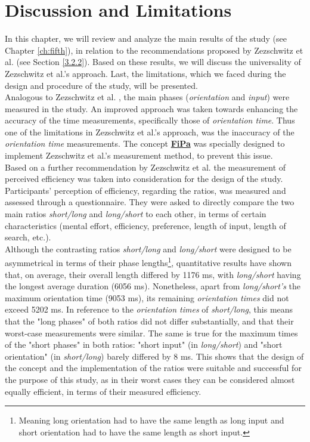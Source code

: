 
\chapter{Discussion and Limitations}\label{ch:sixth}

In this chapter, we will review and analyze the main results of the study (see Chapter \ref{ch:fifth}), in relation to the recommendations proposed by Zezschwitz et al. \cite{Zezschwitz} (see Section \ref{3.2.2}). Based on these results, we will discuss the universality of Zezschwitz et al.'s \cite{Zezschwitz} approach. Last, the limitations, which we faced during the design and procedure of the study, will be presented.\\

Analogous to Zezschwitz et al. \cite{Zezschwitz}, the main phases (\textit{orientation} and \textit{input}) were measured in the study. An improved approach was taken towards enhancing the accuracy of the time measurements, specifically those of \textit{orientation time}. Thus one of the limitations in Zezschwitz et al.'s \cite{Zezschwitz} approach, was the inaccuracy of the \textit{orientation time} measurements. The concept \underline{\textbf{FiPa}} was specially designed to implement Zezschwitz et al.'s \cite{Zezschwitz} measurement method, to prevent this issue. \\
Based on a further recommendation by Zezschwitz et al. \cite{Zezschwitz} the measurement of perceived efficiency was taken into consideration for the design of the study. Participants' perception of efficiency, regarding the ratios, was measured and assessed through a questionnaire. They were asked to directly compare the two main ratios \textit{short/long} and \textit{long/short} to each other, in terms of certain characteristics (mental effort, efficiency, preference, length of input, length of search, etc.). \\

Although the contrasting ratios \textit{short/long} and \textit{long/short} were designed to be asymmetrical in terms of their phase lengths\footnote{Meaning long orientation had to have the same length as long input and short orientation had to have the same length as short input.}, quantitative results have shown that, on average, their overall length differed by 1176 ms, with \textit{long/short} having the longest average duration (6056 ms). Nonetheless, apart from \textit{long/short's} the maximum orientation time (9053 ms), its remaining \textit{orientation times} did not exceed 5202 ms. In reference to the \textit{orientation times} of \textit{short/long}, this means that the "long phases" of both ratios did not differ substantially, and that their worst-case measurements were similar. The same is true for the maximum times of the "short phases" in both ratios: "short input" (in \textit{long/short}) and "short orientation" (in \textit{short/long}) barely differed by 8 ms. This shows that the design of the concept and the implementation of the ratios were suitable and successful for the purpose of this study, as in their worst cases they can be considered almost equally efficient, in terms of their measured efficiency. \\

